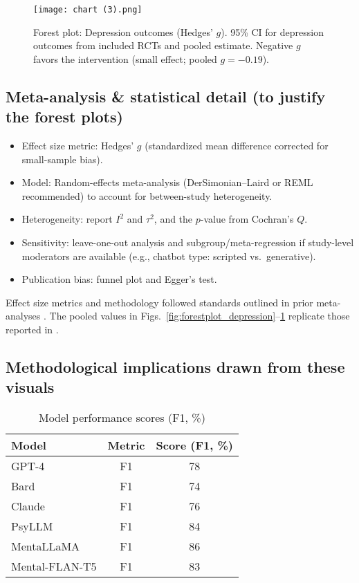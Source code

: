 \documentclass[journal]{IEEEtran}
\begin{document}
\begin{figure}[htbp]
    \centering
    \texttt{[image: chart (3).png]}
    \caption{Forest plot: Depression outcomes (Hedges' $g$). 95\% CI for depression outcomes from included RCTs and pooled estimate. Negative $g$ favors the intervention (small effect; pooled $g=-0.19$).}
    \label{fig:forestplot_anxiety}
\end{figure}

\subsection{Meta-analysis \& statistical detail (to justify the forest plots)}
\begin{itemize}
    \item Effect size metric: Hedges' $g$ (standardized mean difference corrected for small-sample bias).
    \item Model: Random-effects meta-analysis (DerSimonian--Laird or REML recommended) to account for between-study heterogeneity.
    \item Heterogeneity: report $I^2$ and $\tau^2$, and the $p$-value from Cochran's $Q$.
    \item Sensitivity: leave-one-out analysis and subgroup/meta-regression if study-level moderators are available (e.g., chatbot type: scripted vs.\ generative).
    \item Publication bias: funnel plot and Egger's test.
\end{itemize}
Effect size metrics and methodology followed standards outlined in prior meta-analyses \cite{Borenstein2021}. The pooled values in Figs.~\ref{fig:forestplot_depression}–\ref{fig:forestplot_anxiety} replicate those reported in \cite{Zhong2024}.


\subsection{Methodological implications drawn from these visuals}

\begin{table}[htbp]
\centering
\caption{Model performance scores (F1, \%)}
\begin{tabular}{lcc}
\hline
\textbf{Model} & \textbf{Metric} & \textbf{Score (F1, \%)} \\
\hline
GPT-4 & F1 & 78 \\
Bard & F1 & 74 \\
Claude & F1 & 76 \\
PsyLLM & F1 & 84 \\
MentaLLaMA & F1 & 86 \\
Mental-FLAN-T5 & F1 & 83 \\
\hline
\end{tabular}
\label{tab:model_performance}
\end{table}
\end{document}
